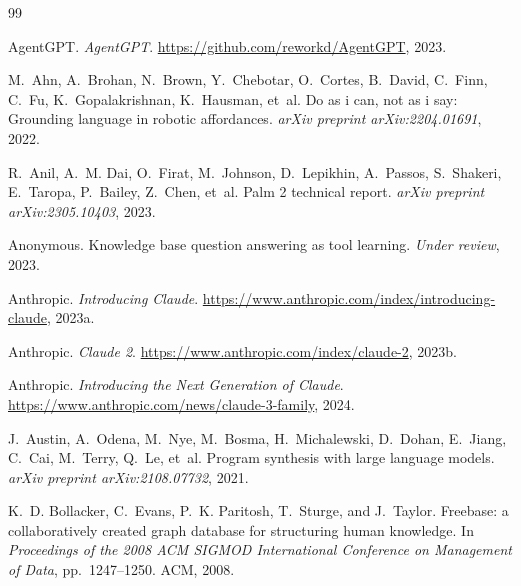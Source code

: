 


\begin{thebibliography}{99}\setlength{\itemsep}{0pt}

AgentGPT.
\newblock \emph{AgentGPT}.
\newblock \url{https://github.com/reworkd/AgentGPT}, 2023.

M.~Ahn, A.~Brohan, N.~Brown, Y.~Chebotar, O.~Cortes, B.~David, C.~Finn,
C.~Fu, K.~Gopalakrishnan, K.~Hausman, et~al.
\newblock Do as i can, not as i say: Grounding language in robotic
affordances.
\newblock \emph{arXiv preprint arXiv:2204.01691}, 2022.

R.~Anil, A.~M. Dai, O.~Firat, M.~Johnson, D.~Lepikhin, A.~Passos,
S.~Shakeri, E.~Taropa, P.~Bailey, Z.~Chen, et~al.
\newblock Palm 2 technical report.
\newblock \emph{arXiv preprint arXiv:2305.10403}, 2023.

Anonymous.
\newblock Knowledge base question answering as tool learning.
\newblock \emph{Under review}, 2023.

Anthropic.
\newblock \emph{Introducing Claude}.
\newblock \url{https://www.anthropic.com/index/introducing-claude}, 2023a.

Anthropic.
\newblock \emph{Claude 2}.
\newblock \url{https://www.anthropic.com/index/claude-2}, 2023b.

Anthropic.
\newblock \emph{Introducing the Next Generation of Claude}.
\newblock \url{https://www.anthropic.com/news/claude-3-family}, 2024.

J.~Austin, A.~Odena, M.~Nye, M.~Bosma, H.~Michalewski, D.~Dohan,
E.~Jiang, C.~Cai, M.~Terry, Q.~Le, et~al.
\newblock Program synthesis with large language models.
\newblock \emph{arXiv preprint arXiv:2108.07732}, 2021.

K.~D. Bollacker, C.~Evans, P.~K. Paritosh, T.~Sturge, and J.~Taylor.
\newblock Freebase: a collaboratively created graph database for structuring
human knowledge.
\newblock In \emph{Proceedings of the 2008 ACM SIGMOD International
Conference on Management of Data}, pp.\ 1247--1250. ACM, 2008.


\end{thebibliography}
